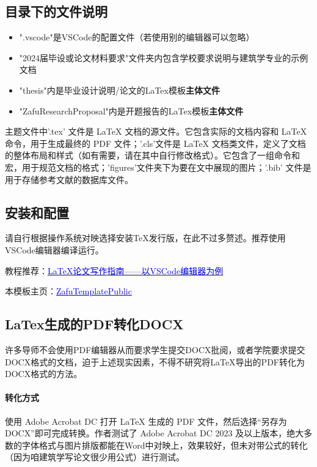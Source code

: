 \documentclass[AutoFakeBold]{ZafuThesis}
\begin{document}
\subsection{目录下的文件说明}
\begin{itemize}
  \item ".vscode"是VSCode的配置文件（若使用别的编辑器可以忽略）
  \item "2024届毕设或论文材料要求"文件夹内包含学校要求说明与建筑学专业的示例文档
  \item "thesis"内是毕业设计说明/论文的LaTex模板{\bfseries 主体文件}
  \item "ZafuResearchProposal"内是开题报告的LaTex模板{\bfseries 主体文件}
\end{itemize}
\par
主题文件中'.tex' 文件是 LaTeX 文档的源文件。它包含实际的文档内容和 LaTeX 命令，用于生成最终的 PDF 文件；'.cls'文件是 LaTeX 文档类文件，定义了文档的整体布局和样式（如有需要，请在其中自行修改格式）。它包含了一组命令和宏，用于规范文档的格式；'figures'文件夹下为要在文中展现的图片；'.bib' 文件是用于存储参考文献的数据库文件。
\subsection{安装和配置}
请自行根据操作系统对映选择安装TeX发行版，在此不过多赘述。推荐使用VSCode编辑器编译运行。\par
教程推荐：\href{https://www.bilibili.com/video/BV12m4y1D7PZ/?vd_source=dfa6f0143619fda15de458493344dd04}{\textcolor{blue}{LaTeX论文写作指南——以VSCode编辑器为例}}\par
本模板主页：\href{https://github.com/Stolorzs/ZafuTemplatePublic}{\textcolor{blue}{ZafuTemplatePublic}}

\subsection{LaTex生成的PDF转化DOCX}
许多导师不会使用PDF编辑器从而要求学生提交DOCX批阅，或者学院要求提交DOCX格式的文档，迫于上述现实因素，不得不研究将LaTeX导出的PDF转化为DOCX格式的方法。\par
\paragraph{转化方式}
使用 Adobe Acrobat DC 打开 LaTeX 生成的 PDF 文件，然后选择“另存为 DOCX”即可完成转换。作者测试了 Adobe Acrobat DC 2023 及以上版本，绝大多数的字体格式与图片排版都能在Word中对映上，效果较好，但未对带公式的转化（因为咱建筑学写论文很少用公式）进行测试。
\end{document}
